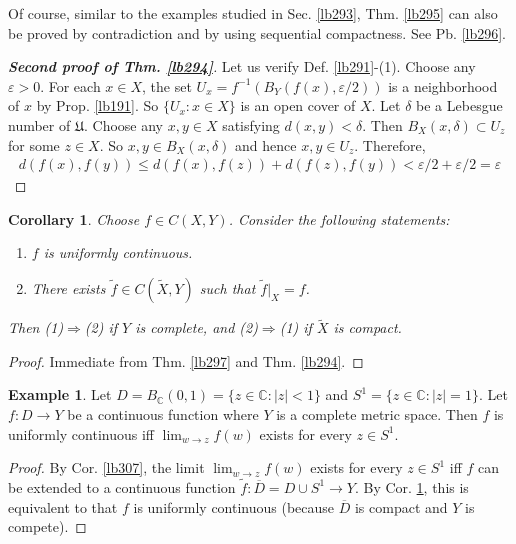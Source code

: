 \documentclass[12pt,b5paper,notitlepage]{article}
\theoremstyle{definition}
\newtheorem{eg}[df]{Example}
\theoremstyle{plain}
\newtheorem{co}[df]{Corollary}
\newcommand{\fk}{\mathfrak}
\newcommand{\wtd}{\widetilde}
\newcommand{\ovl}{\overline}
\newcommand{\Cbb}{\mathbb C}
\newcommand{\eps}{\varepsilon}
\numberwithin{equation}{section}
\begin{document}
Of course, similar to the examples studied in Sec. \ref{lb293}, Thm. \ref{lb295} can also be proved by contradiction and by using sequential compactness. See Pb. \ref{lb296}.



\begin{proof}[\textbf{Second proof of Thm. \ref{lb294}}]
Let us verify Def. \ref{lb291}-(1). Choose any $\eps>0$. For each $x\in X$, the set $U_x=f^{-1}(B_Y(f(x),\eps/2))$ is a neighborhood of $x$ by Prop. \ref{lb191}. So $\{U_x:x\in X\}$ is an open cover of $X$. Let $\delta$ be a Lebesgue number of $\fk U$. Choose any $x,y\in X$ satisfying $d(x,y)<\delta$.  Then $B_X(x,\delta)\subset U_{z}$ for some $z\in X$. So $x,y\in B_X(x,\delta)$ and hence $x,y\in U_z$. Therefore,
\begin{align*}
d(f(x),f(y))\leq d(f(x),f(z))+d(f(z),f(y))<\eps/2+\eps/2=\eps
\end{align*}
\end{proof}



\begin{co}\label{lb298}
Choose $f\in C(X,Y)$. Consider the following statements:
\begin{enumerate}[label=(\arabic*)]
\item $f$ is uniformly continuous.
\item There exists $\wtd f\in C(\wtd X,Y)$ such that $\wtd f|_X=f$.
\end{enumerate}
Then (1)$\Rightarrow$(2) if $Y$ is complete, and (2)$\Rightarrow$(1) if $\wtd X$ is compact.
\end{co}

\begin{proof}
Immediate from Thm. \ref{lb297} and Thm. \ref{lb294}.
\end{proof}


\begin{eg}
Let $D=B_\Cbb(0,1)=\{z\in\Cbb:|z|<1\}$ and $S^1=\{z\in\Cbb:|z|=1\}$. Let $f:D\rightarrow Y$ be a continuous function where $Y$ is a complete metric space. Then $f$ is uniformly continuous iff $\lim_{w\rightarrow z}f(w)$  exists for every $z\in S^1$.
\end{eg}

\begin{proof}
By Cor. \ref{lb307}, the limit $\lim_{w\rightarrow z}f(w)$  exists for every $z\in S^1$  iff $f$ can be extended to a continuous function $\wtd f:\ovl D=D\cup S^1\rightarrow Y$.  By Cor. \ref{lb298}, this is equivalent to that $f$ is uniformly continuous (because $\ovl D$ is compact and $Y$ is compete).
\end{proof}
\end{document}
